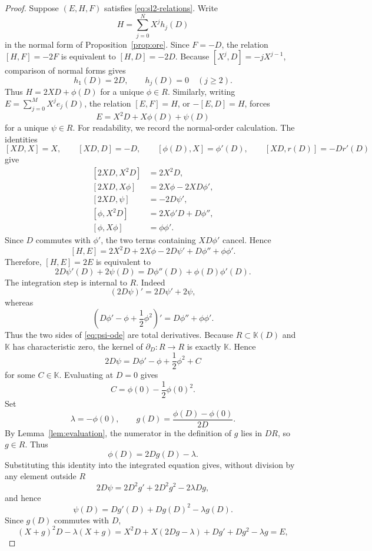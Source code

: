 \documentclass[11pt,reqno]{amsart}
\numberwithin{equation}{section}
\theoremstyle{definition}
\theoremstyle{remark}
\newcommand{\K}{\mathbb K}
\begin{document}
\begin{proof}
Suppose $(E,H,F)$ satisfies \eqref{eq:sl2-relations}.  Write
\[
 H=\sum_{j=0}^{N}X^j h_j(D)
\]
in the normal form of Proposition~\ref{prop:ore}.  Since $F=-D$, the relation $[H,F]=-2F$ is equivalent to $[H,D]=-2D$.  Because $[X^j,D]=-jX^{j-1}$, comparison of normal forms gives
\[
 h_1(D)=2D,
 \qquad
 h_j(D)=0\quad(j\ge2).
\]
Thus $H=2XD+\phi(D)$ for a unique $\phi\in R$. Similarly, writing $E=\sum_{j=0}^{M}X^j e_j(D)$, the relation $[E,F]=H$, or $-[E,D]=H$, forces
\[
 E=X^2D+X\phi(D)+\psi(D)
\]
for a unique $\psi\in R$.  For readability, we record the normal-order calculation.  The identities
\[
 [XD,X]=X,
 \qquad
 [XD,D]=-D,
 \qquad
 [\phi(D),X]=\phi'(D),
 \qquad
 [XD,r(D)]=-Dr'(D)
\]
give
\[
\begin{aligned}
 [2XD,X^2D]&=2X^2D,\\
 [2XD,X\phi]&=2X\phi-2XD\phi',\\
 [2XD,\psi]&=-2D\psi',\\
 [\phi,X^2D]&=2X\phi'D+D\phi'',\\
 [\phi,X\phi]&=\phi\phi'.
\end{aligned}
\]
Since $D$ commutes with $\phi'$, the two terms containing $X D\phi'$ cancel.  Hence
\[
 [H,E]=2X^2D+2X\phi-2D\psi'+D\phi''+\phi\phi'.
\]
Therefore, $[H,E]=2E$ is equivalent to
\begin{equation}\label{eq:psi-ode}
 2D\psi'(D)+2\psi(D)=D\phi''(D)+\phi(D)\phi'(D).
\end{equation}
The integration step is internal to $R$.  Indeed
\[
 (2D\psi)'=2D\psi'+2\psi,
\]
whereas
\[
 \left(D\phi'-\phi+\frac12\phi^2\right)'
 =D\phi''+\phi\phi'.
\]
Thus the two sides of \eqref{eq:psi-ode} are total derivatives.  Because $R\subset\K(D)$ and $\K$ has characteristic zero, the kernel of $\partial_D:R\to R$ is exactly $\K$.  Hence
\[
 2D\psi=D\phi'-\phi+\frac12\phi^2+C
\]
for some $C\in\K$.  Evaluating at $D=0$ gives
\[
 C=\phi(0)-\frac12\phi(0)^2.
\]
Set
\begin{equation}\label{eq:recover-lambda-g}
 \lambda=-\phi(0),
 \qquad
 g(D)=\frac{\phi(D)-\phi(0)}{2D}.
\end{equation}
By Lemma~\ref{lem:evaluation}, the numerator in the definition of $g$ lies in $DR$, so $g\in R$.  Thus
\[
 \phi(D)=2Dg(D)-\lambda.
\]
Substituting this identity into the integrated equation gives, without division by any element outside $R$
\[
 2D\psi=2D^2g'+2D^2g^2-2\lambda Dg,
\]
and hence
\[
 \psi(D)=Dg'(D)+Dg(D)^2-\lambda g(D).
\]
Since $g(D)$ commutes with $D$,
\[
 (X+g)^2D-\lambda(X+g)
 =X^2D+X(2Dg-\lambda)+Dg'+Dg^2-\lambda g=E,
\]
\end{proof}
\end{document}
